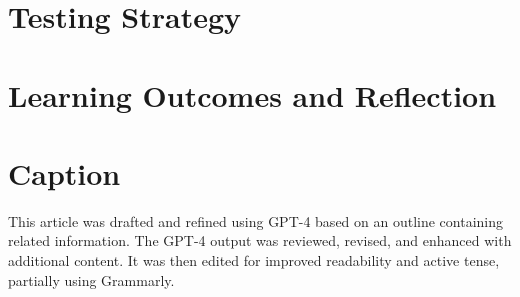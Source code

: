 \documentclass[a4paper, 11pt]{article}
\begin{document}

\section{Testing Strategy}


\section{Learning Outcomes and Reflection}


\section*{Caption}
This article was drafted and refined using GPT-4 based on an outline containing related information. The GPT-4 output was reviewed, revised, and enhanced with additional content. It was then edited for improved readability and active tense, partially using Grammarly.
\end{document}
